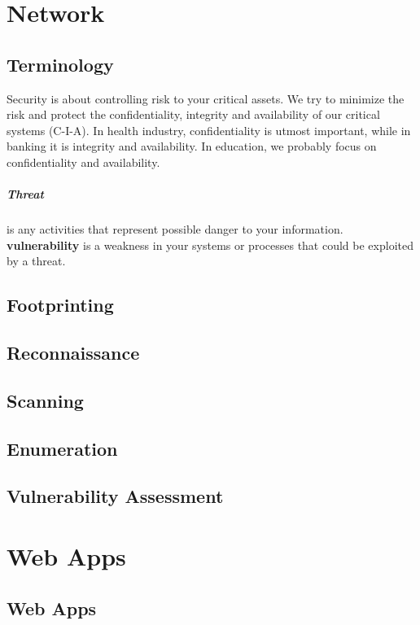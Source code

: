 \documentclass[7x9]{times}
\begin{document}
\chapter{Network}

\section{Terminology}

Security is about controlling risk to your critical assets.
We try to minimize the risk and protect the confidentiality,
integrity and availability of our critical systems (C-I-A).
In health industry, confidentiality is utmost important,
while in banking it is integrity and availability. In
education, we probably focus on confidentiality and
availability.

\paragraph{Threat} is any activities that represent possible
danger to your information. \textbf{vulnerability} is a 
weakness in your systems or processes that could be 
exploited by a threat. 


\section{Footprinting}

\section{Reconnaissance}
\section{Scanning}
\section{Enumeration}
\section{Vulnerability Assessment}



\chapter{Web Apps}
\section{Web Apps}
\end{document}
